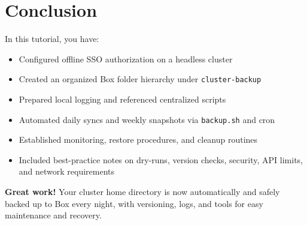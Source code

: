 \documentclass[12pt,letterpaper]{article}
\begin{document}
\section{Conclusion}

In this tutorial, you have:
\begin{itemize}
  \item Configured offline SSO authorization on a headless cluster
  \item Created an organized Box folder hierarchy under \texttt{cluster-backup}
  \item Prepared local logging and referenced centralized scripts
  \item Automated daily syncs and weekly snapshots via \texttt{backup.sh} and cron
  \item Established monitoring, restore procedures, and cleanup routines
  \item Included best-practice notes on dry-runs, version checks, security, API limits, and network requirements
\end{itemize}

\vspace{1em}
\noindent\textbf{Great work!} Your cluster home directory is now automatically and safely backed up to Box every night, with versioning, logs, and tools for easy maintenance and recovery.
\end{document}
